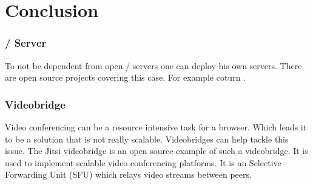 \clearpage
\chapter{Conclusion}

\subsection{ /  Server}
To not be dependent from open / servers one can deploy his own servers. There are open source projects covering this case. For example coturn \cite{coturn}.

\subsection{Videobridge}
Video conferencing can be a resource intensive task for a browser. Which leads it to be a solution that is not really scalable. Videobridges can help tackle this issue. The Jitsi videobridge is an open source example of such a videobridge. It is used to implement scalable video conferencing platforms. It is an Selective Forwarding Unit (SFU) which relays video streams between peers.
